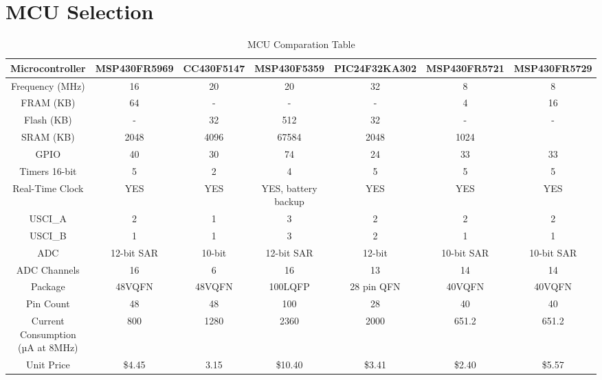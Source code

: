 \section{MCU Selection}

\begin{table}[htbp]
  \centering
  \caption{MCU Comparation Table}
    \begin{tabular}{|c|c|c|c|c|c|c|}
    \hline
    Microcontroller & MSP430FR5969 & CC430F5147 & MSP430F5359 & PIC24F32KA302 & MSP430FR5721 & MSP430FR5729\\ \hline
    \hline
    Frequency (MHz) & 16    & 20    & 20    & 32    & 8 & 8\\ \hline
    FRAM (KB) & 64    & -     & -     & -     & 4 & 16\\ \hline
    Flash (KB) & -     & 32    & 512   & 32    & - & -\\ \hline
    SRAM (KB) & 2048  & 4096  & 67584 & 2048  & 1024 \\ \hline
    GPIO  & 40    & 30    & 74    & 24    & 33  &33 \\ \hline
    Timers 16-bit & 5     & 2     & 4     & 5     & 5  & 5\\ \hline
    Real-Time Clock & YES   & YES   & YES, battery backup & YES   & YES & YES\\ \hline
    USCI\_A & 2     & 1     & 3     & 2     & 2 & 2\\ \hline
    USCI\_B & 1     & 1     & 3     & 2     & 1 &1\\ \hline
    ADC   & 12-bit SAR & 10-bit & 12-bit SAR & 12-bit & 10-bit SAR & 10-bit SAR\\ \hline
    ADC Channels & 16    & 6     & 16    & 13    & 14 & 14\\ \hline
    Package & 48VQFN & 48VQFN & 100LQFP & 28 pin QFN & 40VQFN & 40VQFN\\ \hline
    Pin Count & 48    & 48    & 100   & 28    & 40 & 40 \\ \hline
    Current Consumption (µA at 8MHz) & 800   & 1280  & 2360  & 2000  & 651.2 & 651.2 \\ \hline
    Unit Price & \$4.45  & 3.15  & \$10.40 & \$3.41  & \$2.40  & \$5.57\\ \hline
    \end{tabular}%
  \label{tab:mcuComp}%
\end{table}%
